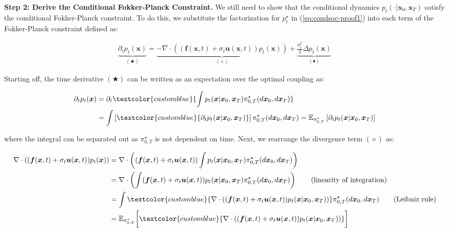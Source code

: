 \documentclass{article}
\newcommand{\bluetext}[1]{\textcolor{customblue}{#1}}
\begin{document}
\textbf{Step 2: Derive the Conditional Fokker-Planck Constraint. }
We still need to show that the conditional dynamics $p_t(\cdot|\boldsymbol{x}_0, \boldsymbol{x}_T)$ satisfy the conditional Fokker-Planck constraint. To do this, we substitute the factorization for $p_t^\star$ in (\ref{eq:condsoc-proof1}) into each term of the Fokker-Planck constraint defined as:
\begin{small}
\begin{align}
    \underbrace{\partial_tp_t(\boldsymbol{x})}_{(\bigstar)}=\underbrace{-\nabla\cdot \left((\boldsymbol{f}(\boldsymbol{x},t)+\sigma_t\boldsymbol{u}(\boldsymbol{x},t))p_t(\boldsymbol{x})\right)}_{(\diamond)}+\underbrace{\frac{\sigma^2_t}{2}\Delta p_t(\boldsymbol{x})}_{(\blacklozenge)}\label{eq:condsoc-proof2}
\end{align}
\end{small}
Starting off, the time derivative $(\bigstar)$ can be written as an expectation over the optimal coupling as:
\begin{small}
\begin{align}
    \partial_tp_t(\boldsymbol{x})&=\partial_t\bluetext{\int p_t(\boldsymbol{x}|\boldsymbol{x}_0, \boldsymbol{x}_T)\pi^\star_{0,T}(d\boldsymbol{x}_0, d\boldsymbol{x}_T)}\nonumber\\
    &= \int\left[\bluetext{\partial_t p_t(\boldsymbol{x}|\boldsymbol{x}_0, \boldsymbol{x}_T)}\right]\pi^\star_{0,T}(d\boldsymbol{x}_0, d\boldsymbol{x}_T)=\mathbb{E}_{\pi^\star_{0,T}}\left[\partial_tp_t(\boldsymbol{x}|\boldsymbol{x}_0, \boldsymbol{x}_T)\right]
\end{align}
\end{small}
where the integral can be separated out as $\pi_{0,T}^\star$ is not dependent on time. Next, we rearrange the divergence term $(\diamond)$ as:
\begin{small}
\begin{align}
    \nabla\cdot \left((\boldsymbol{f}(\boldsymbol{x},t)+\sigma_t\boldsymbol{u}(\boldsymbol{x},t))p_t(\boldsymbol{x})\right)&=\nabla\cdot \left((\boldsymbol{f}(\boldsymbol{x},t)+\sigma_t\boldsymbol{u}(\boldsymbol{x},t))\int p_t(\boldsymbol{x}|\boldsymbol{x}_0, \boldsymbol{x}_T)\pi_{0,T}^\star(d\boldsymbol{x}_0, d\boldsymbol{x}_T)\right)\nonumber\\
    &=\nabla\cdot \left(\int(\boldsymbol{f}(\boldsymbol{x},t)+\sigma_t\boldsymbol{u}(\boldsymbol{x},t)) p_t(\boldsymbol{x}|\boldsymbol{x}_0, \boldsymbol{x}_T)\pi_{0,T}^\star(d\boldsymbol{x}_0, d\boldsymbol{x}_T)\right)\tag{linearity of integration}\\
    &=\int\bluetext{\nabla\cdot \left((\boldsymbol{f}(\boldsymbol{x},t)+\sigma_t\boldsymbol{u}(\boldsymbol{x},t)) p_t(\boldsymbol{x}|\boldsymbol{x}_0, \boldsymbol{x}_T)\right)}\pi_{0,T}^\star(d\boldsymbol{x}_0, d\boldsymbol{x}_T)\tag{Leibniz rule}\\
    &=\mathbb{E}_{\pi_{0,T}^\star}\bigg[\bluetext{\nabla\cdot \left((\boldsymbol{f}(\boldsymbol{x},t)+\sigma_t\boldsymbol{u}(\boldsymbol{x},t)) p_t(\boldsymbol{x}|\boldsymbol{x}_0, \boldsymbol{x}_T)\right)}\bigg]
\end{align}
\end{small}
\end{document}
